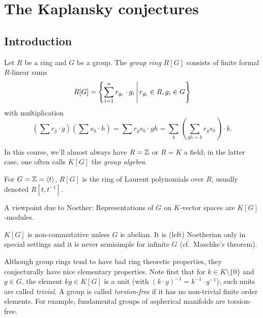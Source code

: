 \chapter{The Kaplansky conjectures}

\section{Introduction}

\begin{definition}
    Let $R$ be a ring and $G$ be a group. The \emph{group ring} $R[G]$ consists of finite formal $R$-linear sums \[
        R[G] = \left\{  \sum_{i=1}^n r_{g_i} \cdot g_i  \,\middle|\,  r_{g_i} \in R, g_i \in G  \right\}
    \] with multiplication \[
        (\sum r_g \cdot g)(\sum s_h \cdot h) = \sum r_g s_h \cdot g h = \sum_k (\sum_{gh = k} r_g s_h) \cdot k.
    \]
\end{definition}

In this course, we'll almost always have $R = \mathbb{Z}$ or $R = K$ a field; in the latter case, one often calls $K[G]$ the \emph{group algebra}.

\begin{center}
\end{center}

\begin{example}
    For $G = \mathbb{Z} = \langle t \rangle$, $R[G]$ is the ring of Laurent polynomials over $R$, usually denoted $R[t,t^{-1}]$.
\end{example}

A viewpoint due to Noether: Representations of $G$ on $K$-vector spaces are $K[G]$-modules.

\begin{warning}
    $K[G]$ is non-commutative unless $G$ is abelian. It is (left) Noetherian only in special settings and it is never semisimple for infinite $G$ (cf.\ Maschke's theorem).
\end{warning}

Although group rings tend to have bad ring theoretic properties, they conjecturally have nice elementary properties.
Note first that for $k \in K \setminus \{0\}$ and $g \in G$, the element $kg \in K[G]$ is a unit (with $(k \cdot g)^{-1} = k^{-1} \cdot g^{-1}$); such units are called \emph{trivial}.
A group is called \emph{torsion-free} if it has no non-trivial finite order elements.
For example, fundamental groups of aspherical manifolds are torsion-free.

